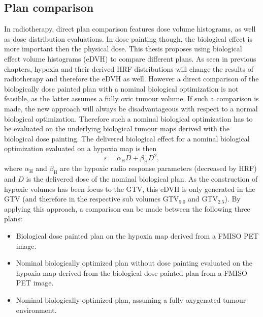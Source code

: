 \subsection{Plan comparison}\label{chap:plancomparison}
In radiotherapy, direct plan comparison features dose volume histograms, as well as dose distribution evaluations. In dose painting though, the biological effect is more important then the physical dose. This thesis proposes using biological effect volume histograms (eDVH) to compare different plans. As seen in previous chapters, hypoxia and their derived HRF distributions will change the results of radiotherapy and therefore the eDVH as well. However a direct comparison of the biologically dose painted plan with a nominal biological optimization is not feasible, as the latter assumes a fully oxic tumour volume. If such a comparison is made, the new approach will always be disadvantageous with respect to a normal biological optimization. Therefore such a nominal biological optimization has to be evaluated on the underlying biological tumour maps derived with the biological dose painting. The delivered biological effect for a nominal biological optimization evaluated on a hypoxia map is then
\begin{equation}
\varepsilon = \alpha_\mathrm{H} D + \beta_\mathrm{H}D^2,
\end{equation}
where $\alpha_\mathrm{H}$ and $\beta_\mathrm{H}$ are the hypoxic radio response parameters (decreased by HRF) and $D$ is the delivered dose of the nominal biological plan. As the construction of hypoxic volumes has been focus to the GTV, this eDVH is only generated in the GTV (and therefore in the respective sub volumes GTV$_\mathrm{5.0}$ and GTV$_\mathrm{2.5}$). By applying this approach, a comparison can be made between the following three plans:
\begin{itemize}
\item Biological dose painted plan on the hypoxia map derived from a FMISO PET image.
\item Nominal biologically optimized plan without dose painting evaluated on the hypoxia map derived from the biological dose painted plan from a FMISO PET image.
\item Nominal biologically optimized plan, assuming a fully oxygenated tumour environment.
\end{itemize}